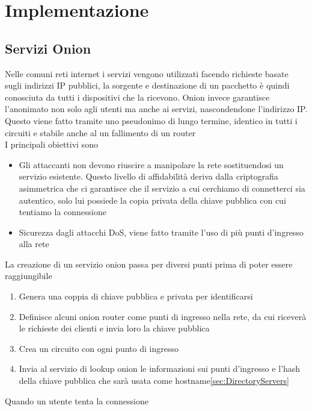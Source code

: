 \chapter{Implementazione}

\section{Servizi Onion}
Nelle comuni reti internet i servizi vengono utilizzati facendo richieste basate sugli indirizzi IP pubblici, la sorgente e destinazione di un pacchetto è quindi conosciuta da tutti i dispositivi che la ricevono. 
Onion invece garantisce l'anonimato non solo agli utenti ma anche ai servizi, nascondendone l'indirizzo IP. 
Questo viene fatto tramite uno pseudonimo di lungo termine, identico in tutti i circuiti e stabile anche al un fallimento di un router \\
I principali obiettivi sono
\begin{itemize}
    \item Gli attaccanti non devono riuscire a manipolare la rete sostituendosi un servizio esistente. Questo livello di affidabilità deriva dalla criptografia asimmetrica che ci garantisce che il servizio a cui cerchiamo di connetterci sia autentico, solo lui possiede la copia privata della chiave pubblica con cui tentiamo la connessione
    \item Sicurezza dagli attacchi DoS, viene fatto tramite l'uso di più punti d'ingresso alla rete 
\end{itemize}
La creazione di un servizio onion passa per diversi punti prima di poter essere raggiungibile
\begin{enumerate}
    \item Genera una coppia di chiave pubblica e privata per identificarsi
    \item Definisce alcuni onion router come punti di ingresso nella rete, da cui riceverà le richieste dei clienti e invia loro la chiave pubblica
    \item Crea un circuito con ogni punto di ingresso
    \item Invia al servizio di lookup onion le informazioni sui punti d'ingresso e l'hash della chiave pubblica che sarà usata come hostname\ref{sec:DirectoryServers}
\end{enumerate}
Quando un utente tenta la connessione
